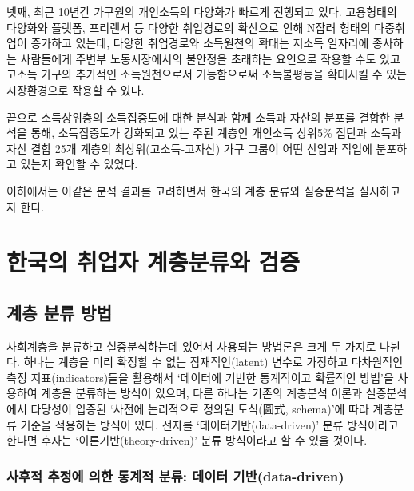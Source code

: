 \documentclass[
  letterpaper,
  DIV=11,
  numbers=noendperiod]{scrartcl}
\begin{document}
넷째, 최근 10년간 가구원의 개인소득의 다양화가 빠르게 진행되고 있다.
고용형태의 다양화와 플랫폼, 프리랜서 등 다양한 취업경로의 확산으로 인해
N잡러 형태의 다중취업이 증가하고 있는데, 다양한 취업경로와 소득원천의
확대는 저소득 일자리에 종사하는 사람들에게 주변부 노동시장에서의
불안정을 초래하는 요인으로 작용할 수도 있고 고소득 가구의 추가적인
소득원천으로서 기능함으로써 소득불평등을 확대시킬 수 있는 시장환경으로
작용할 수 있다.

끝으로 소득상위층의 소득집중도에 대한 분석과 함께 소득과 자산의 분포를
결합한 분석을 통해, 소득집중도가 강화되고 있는 주된 계층인 개인소득
상위5\% 집단과 소득과 자산 결합 25개 계층의 최상위(고소득-고자산) 가구
그룹이 어떤 산업과 직업에 분포하고 있는지 확인할 수 있었다.

이하에서는 이같은 분석 결과를 고려하면서 한국의 계층 분류와 실증분석을
실시하고자 한다.

\section{한국의 취업자 계층분류와
검증}\label{uxd55cuxad6duxc758-uxcde8uxc5c5uxc790-uxacc4uxce35uxbd84uxb958uxc640-uxac80uxc99d}

\subsection{계층 분류
방법}\label{uxacc4uxce35-uxbd84uxb958-uxbc29uxbc95}

사회계층을 분류하고 실증분석하는데 있어서 사용되는 방법론은 크게 두
가지로 나뉜다. 하나는 계층을 미리 확정할 수 없는 잠재적인(latent) 변수로
가정하고 다차원적인 측정 지표(indicators)들을 활용해서 `데이터에 기반한
통계적이고 확률적인 방법'을 사용하여 계층을 분류하는 방식이 있으며, 다른
하나는 기존의 계층분석 이론과 실증분석에서 타당성이 입증된 `사전에
논리적으로 정의된 도식(圖式, schema)'에 따라 계층분류 기준을 적용하는
방식이 있다. 전자를 `데이터기반(data-driven)' 분류 방식이라고 한다면
후자는 `이론기반(theory-driven)' 분류 방식이라고 할 수 있을 것이다.

\subsubsection{사후적 추정에 의한 통계적 분류: 데이터
기반(data-driven)}\label{uxc0acuxd6c4uxc801-uxcd94uxc815uxc5d0-uxc758uxd55c-uxd1b5uxacc4uxc801-uxbd84uxb958-uxb370uxc774uxd130-uxae30uxbc18data-driven}
\end{document}
